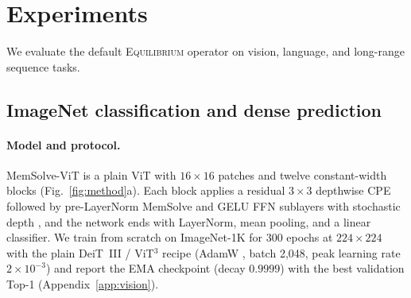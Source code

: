 \documentclass[10pt,twocolumn]{article}
\begin{document}
\section{Experiments}
\label{sec:experiments}

We evaluate the default \textsc{Equilibrium} operator on vision, language, and
long-range sequence tasks.

\subsection{ImageNet classification and dense prediction}

\paragraph{Model and protocol.}
MemSolve-ViT is a plain ViT \cite{dosovitskiy2021vit} with $16\times16$
patches and twelve constant-width blocks (Fig.~\ref{fig:method}a).
Each block applies a residual $3\times3$ depthwise CPE \cite{chu2023cpe}
followed by pre-LayerNorm MemSolve and GELU FFN sublayers with stochastic depth
\cite{huang2016stochastic}, and the network ends with LayerNorm, mean pooling,
and a linear classifier.
We train from scratch on ImageNet-1K \cite{russakovsky2015imagenet} for 300
epochs at $224\times224$ with the plain DeiT~III / ViT$^3$ recipe
\cite{touvron2022deit3,han2026vit3} (AdamW \cite{loshchilov2019adamw}, batch
2,048, peak learning rate $2\times10^{-3}$) and report the EMA checkpoint
(decay $0.9999$) with the best validation Top-1 (Appendix~\ref{app:vision}).
\end{document}
